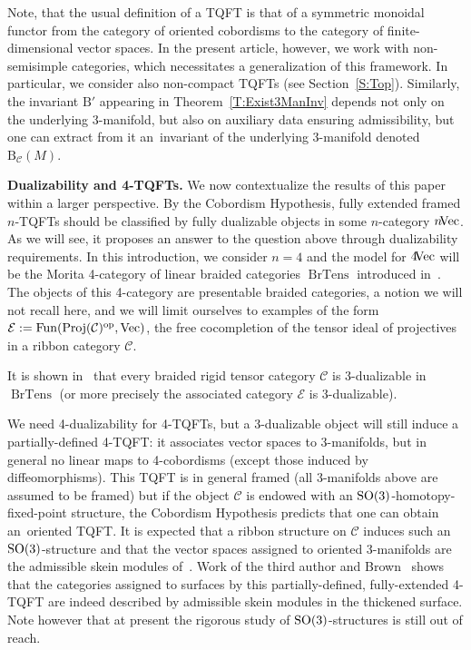 \documentclass[10pt,a4paper]{amsart}
\numberwithin{equation}{section}
\numberwithin{theorem}{section}
\numberwithin{proposition}{section}
\numberwithin{definition}{section}
\numberwithin{lemma}{section}
\numberwithin{corollary}{section}
\numberwithin{remark}{section}
\numberwithin{example}{section}
\newcommand{\cat}{\mathcal{C}}
\newcommand{\CC}{\mathcal{C}}
\newcommand{\EE}{\mathcal{E}}
\newcommand{\Vect}{\mathrm{Vec}}
\newcommand{\ThreeManInv}{\mathrm{B}}
\begin{document}
Note, that the usual definition of a TQFT is that of a symmetric monoidal functor from the category of oriented cobordisms to the category of finite-dimensional vector spaces. In the present article, however, we work with non-semisimple categories, which necessitates a generalization of this framework.
In particular, we consider also non-compact TQFTs (see Section~\ref{S:Top}).
Similarly, the invariant $\ThreeManInv'$ appearing in Theorem~\ref{T:Exist3ManInv} depends not only on the underlying 3-manifold, but also on auxiliary data ensuring admissibility,
but one can extract from it an~invariant of the underlying $3$-manifold denoted $\ThreeManInv_{\cat}(M)$.

\textbf{Dualizability and 4-TQFTs.}
We now contextualize the results of this paper within a larger perspective.
By the Cobordism Hypothesis, fully extended framed $n$-TQFTs should be classified by fully dualizable objects in some $n$-category $n\hskip-2pt\Vect$. As we will see, it proposes an answer to the question above through dualizability requirements. In this introduction, we consider $n=4$ and the model for $4\hskip-2pt\Vect$
will be
 the Morita 4-category of linear braided categories $\operatorname{BrTens}$ introduced in~\cite{BJS, JFS}.
The objects of this 4-category are presentable braided categories, a notion we will not recall here, and we will limit ourselves to examples of the form $\EE:= \operatorname{Fun}(\operatorname{Proj}(\CC)^{\rm op}, \Vect)$, the free cocompletion of the tensor ideal of projectives in a ribbon category $\CC$.


It is shown in~\cite{BJS} that every braided rigid tensor category $\CC$ is
3-dualizable in $\operatorname{BrTens}$
(or more precisely the associated category $\EE$ is 3-dualizable).

We need 4-dualizability for 4-TQFTs, but a 3-dualizable object will still induce a partially-defined 4-TQFT: it
associates
vector spaces to 3-manifolds, but
in general no
linear maps to 4-cobordisms (except those induced by diffeomorphisms). This TQFT is in general framed (all 3-manifolds above are assumed to be framed) but if the object $\CC$ is endowed with an ${\rm SO}(3)$-homotopy-fixed-point structure, the Cobordism Hypothesis predicts that one can obtain an~oriented TQFT. It is expected that a ribbon structure on $\CC$ induces such an ${\rm SO}(3)$-structure and that the vector spaces assigned to oriented 3-manifolds are the admissible skein modules of~\cite{CGP22}. Work of the third author and Brown~\cite{BH} shows that the categories assigned to surfaces by this partially-defined, fully-extended 4-TQFT are indeed described by admissible skein modules in the thickened surface.
Note however that at present the rigorous study of ${\rm SO}(3)$-structures is still out of reach.
\end{document}
